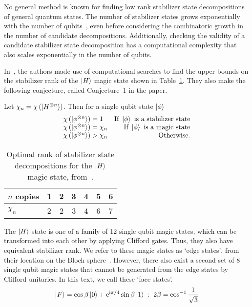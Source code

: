 No general method is known for finding low rank stabilizer state decompositions of general quantum states. The number of stabilizer states grows exponentially with the number of qubits~\cite{Aaronson2004}, even before considering the combinatoric growth in the number of candidate decompositions. Additionally, checking the validity of a candidate stabilizer state decomposition has a computational complexity that also scales exponentially in the number of qubits.\par
In~\cite{Bravyi2015}, the authors made use of computational searches to find the upper bounds on the stabilizer rank of the $\ket{H}$ magic state shown in Table~\ref{tab:bss_h_rank}. They also make the following conjecture, called Conjecture~1 in the paper.
\begin{conj}
Let $\chi_{n}=\chi\left(\ket{H^{\otimes n}}\right)$. Then for a single qubit state $\ket{\phi}$
\[
\begin{array}{lr}
\chi\left(\ket{\phi^{\otimes n}}\right) = 1 & \text{If }\ket{\phi}\text{ is a stabilizer state}\\
\chi\left(\ket{\phi^{\otimes n}}\right) = \chi_{n} & \text{If }\ket{\phi}\text{ is a magic state}\\
\chi\left(\ket{\phi^{\otimes n}}\right) > \chi_{n} & \text{Otherwise.}
\end{array}
\]
\label{conj:magic_srank}
\end{conj}
\begin{table}[H]
\centering
\begin{tabular}{|l|c|c|c|c|c|c|}
\hline
$n$ copies & 1 & 2 & 3 & 4 & 5 & 6 \\
\hline
$\chi_{n}$ & 2 & 2 & 3 & 4 & 6 & 7\\
\hline
\end{tabular}
\caption{Optimal rank of stabilizer state decompositions for the $\ket{H}$ magic state, from~\cite{Bravyi2015}.}
\label{tab:bss_h_rank}
\end{table}
The $\ket{H}$ state is one of a family of $12$ single qubit magic states, which can be transformed into each other by applying Clifford gates. Thus, they also have equivalent stabilizer rank. We refer to these magic states as `edge states', from their location on the Bloch sphere~\cite{Bravyi2005}. However, there also exist a second set of $8$ single qubit magic states that cannot be generated from the edge states by Clifford unitaries. In this text, we call these `face states'.
\begin{equation}
\ket{F} = \cos{\beta}\ket{0}+\mathrm{e}^{\mathrm{i} \pi/4}\sin{\beta}\ket{1} \;:\;2\beta=\cos^{-1}{\frac{1}{\sqrt{3}}}
\label{eq:face_state}
\end{equation}
